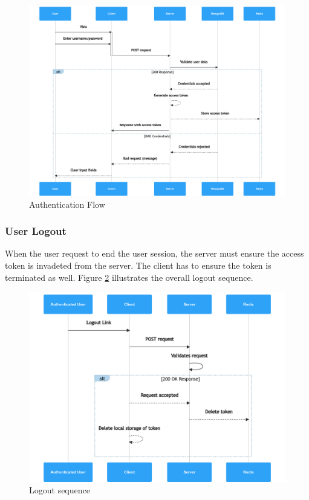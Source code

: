 \begin{figure}
    \centering
    \includegraphics[width=\textwidth]{../../img/chapter-4/auth-flow.png}
    \caption{Authentication Flow}
    \label{fig:auth-flow}
\end{figure}

\subsubsection{User Logout}
When the user request to end the user session, the server must ensure the access token is invadeted from the server. The client has to ensure the token is terminated as well. Figure \ref{fig:logout-seq} illustrates the overall logout sequence.

\begin{figure}
    \centering
    \includegraphics[width=\textwidth]{../../img/chapter-4/logout-sequence.png}
    \caption{Logout sequence}
    \label{fig:logout-seq}
\end{figure}

